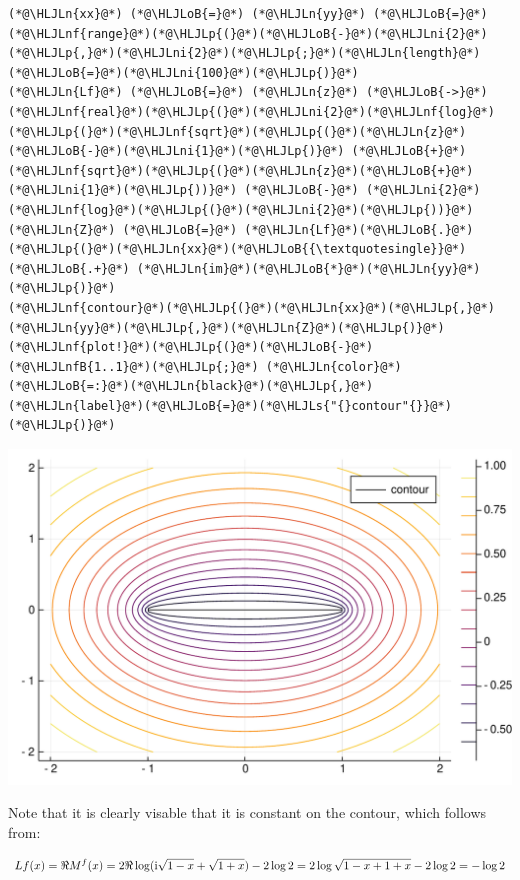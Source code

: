 \documentclass[12pt,a4paper]{article}
\newcommand{\HLJLn}[1]{#1}
\newcommand{\HLJLnf}[1]{\textcolor[RGB]{66,102,213}{#1}}
\newcommand{\HLJLs}[1]{\textcolor[RGB]{201,61,57}{#1}}
\newcommand{\HLJLnfB}[1]{\textcolor[RGB]{59,151,46}{#1}}
\newcommand{\HLJLni}[1]{\textcolor[RGB]{59,151,46}{#1}}
\newcommand{\HLJLoB}[1]{\textcolor[RGB]{102,102,102}{\textbf{#1}}}
\newcommand{\HLJLp}[1]{#1}
\def\I{ {\rm i} }
\begin{document}
\begin{lstlisting}
(*@\HLJLn{xx}@*) (*@\HLJLoB{=}@*) (*@\HLJLn{yy}@*) (*@\HLJLoB{=}@*) (*@\HLJLnf{range}@*)(*@\HLJLp{(}@*)(*@\HLJLoB{-}@*)(*@\HLJLni{2}@*)(*@\HLJLp{,}@*)(*@\HLJLni{2}@*)(*@\HLJLp{;}@*)(*@\HLJLn{length}@*)(*@\HLJLoB{=}@*)(*@\HLJLni{100}@*)(*@\HLJLp{)}@*)
(*@\HLJLn{Lf}@*) (*@\HLJLoB{=}@*) (*@\HLJLn{z}@*) (*@\HLJLoB{->}@*) (*@\HLJLnf{real}@*)(*@\HLJLp{(}@*)(*@\HLJLni{2}@*)(*@\HLJLnf{log}@*)(*@\HLJLp{(}@*)(*@\HLJLnf{sqrt}@*)(*@\HLJLp{(}@*)(*@\HLJLn{z}@*)(*@\HLJLoB{-}@*)(*@\HLJLni{1}@*)(*@\HLJLp{)}@*) (*@\HLJLoB{+}@*) (*@\HLJLnf{sqrt}@*)(*@\HLJLp{(}@*)(*@\HLJLn{z}@*)(*@\HLJLoB{+}@*)(*@\HLJLni{1}@*)(*@\HLJLp{))}@*) (*@\HLJLoB{-}@*) (*@\HLJLni{2}@*)(*@\HLJLnf{log}@*)(*@\HLJLp{(}@*)(*@\HLJLni{2}@*)(*@\HLJLp{))}@*)
(*@\HLJLn{Z}@*) (*@\HLJLoB{=}@*) (*@\HLJLn{Lf}@*)(*@\HLJLoB{.}@*)(*@\HLJLp{(}@*)(*@\HLJLn{xx}@*)(*@\HLJLoB{{\textquotesingle}}@*) (*@\HLJLoB{.+}@*) (*@\HLJLn{im}@*)(*@\HLJLoB{*}@*)(*@\HLJLn{yy}@*)(*@\HLJLp{)}@*)
(*@\HLJLnf{contour}@*)(*@\HLJLp{(}@*)(*@\HLJLn{xx}@*)(*@\HLJLp{,}@*)(*@\HLJLn{yy}@*)(*@\HLJLp{,}@*)(*@\HLJLn{Z}@*)(*@\HLJLp{)}@*)
(*@\HLJLnf{plot!}@*)(*@\HLJLp{(}@*)(*@\HLJLoB{-}@*)(*@\HLJLnfB{1..1}@*)(*@\HLJLp{;}@*) (*@\HLJLn{color}@*)(*@\HLJLoB{=:}@*)(*@\HLJLn{black}@*)(*@\HLJLp{,}@*) (*@\HLJLn{label}@*)(*@\HLJLoB{=}@*)(*@\HLJLs{"{}contour"{}}@*)(*@\HLJLp{)}@*)
\end{lstlisting}

\includegraphics[width=\linewidth]{figures/Lecture18_5_1.pdf}

Note that it is clearly visable that it is constant on the contour, which follows from:

\[
L f(x) = \Re M^ f(x) = 2\Re \log(\I \sqrt{1-x} + \sqrt{1+x}) -2 \log 2 = 2 \log\sqrt{1-x+1+x} - 2 \log 2 = - \log 2
\]
\end{document}
